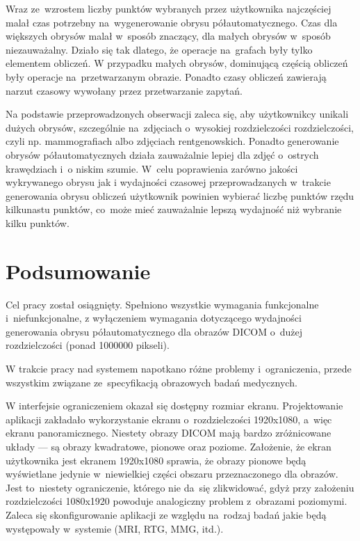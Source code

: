 \documentclass[a4paper,11pt,twoside,openright]{report}
\newcommand\blankpage{%
    \null
    \thispagestyle{empty}%
    \newpage}
\theoremstyle{definition}
\begin{document}
Wraz ze~wzrostem liczby punktów wybranych przez użytkownika najczęściej malał
czas potrzebny na~wygenerowanie obrysu półautomatycznego. Czas dla większych
obrysów malał w~sposób znaczący, dla małych obrysów w~sposób niezauważalny.
Działo się tak dlatego, że operacje na~grafach były tylko elementem obliczeń. W
przypadku małych obrysów, dominującą częścią obliczeń były operacje na~przetwarzanym
obrazie. Ponadto czasy obliczeń zawierają narzut czasowy wywołany przez
przetwarzanie zapytań.

Na podstawie przeprowadzonych obserwacji zaleca się, aby użytkownikcy unikali
dużych obrysów, szczególnie na~zdjęciach o~wysokiej rozdzielczości rozdzielczości,
czyli np. mammografiach albo zdjęciach rentgenowskich. Ponadto generowanie obrysów
półautomatycznych działa zauważalnie lepiej dla zdjęć o~ostrych krawędziach i~o
niskim szumie. W~celu poprawienia zarówno jakości wykrywanego obrysu jak i
wydajności czasowej przeprowadzanych w~trakcie generowania obrysu obliczeń użytkownik
powinien wybierać liczbę punktów rzędu kilkunastu punktów, co~może mieć zauważalnie
lepszą wydajność niż wybranie kilku punktów.

\afterpage{\blankpage}
\chapter {Podsumowanie}


Cel pracy został osiągnięty. Spełniono wszystkie wymagania funkcjonalne i~niefunkcjonalne,
z wyłączeniem wymagania dotyczącego wydajności generowania obrysu półautomatycznego
dla obrazów DICOM o~dużej rozdzielczości (ponad 1000000 pikseli).

W trakcie pracy nad systemem napotkano różne problemy i~ograniczenia, przede wszystkim
związane ze~specyfikacją obrazowych badań medycznych.

W interfejsie ograniczeniem okazał się dostępny rozmiar ekranu. Projektowanie
aplikacji zakładało wykorzystanie ekranu o~rozdzielczości 1920x1080, a~więc ekranu
panoramicznego. Niestety obrazy DICOM mają bardzo zróżnicowane układy --- są obrazy
kwadratowe, pionowe oraz poziome. Założenie, że ekran użytkownika jest ekranem
1920x1080 sprawia, że obrazy pionowe będą wyświetlane jedynie w~niewielkiej
części obszaru przeznaczonego dla obrazów. Jest to~niestety ograniczenie, którego
nie da~się zlikwidować, gdyż przy założeniu rozdzielczości 1080x1920 powoduje
analogiczny problem z~obrazami poziomymi. Zaleca się skonfigurowanie aplikacji
ze względu na~rodzaj badań jakie będą występowały w~systemie (MRI, RTG, MMG, itd.).
\end{document}

